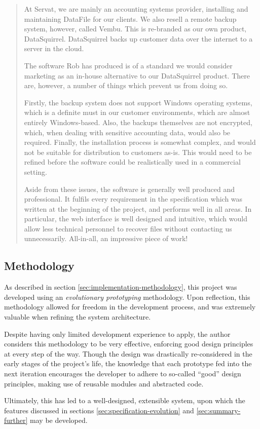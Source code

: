 \begin{quote}
\begin{em}

    At Servat, we are mainly an accounting systems provider, installing and
    maintaining DataFile for our clients. We also resell a remote backup
    system, however, called Vembu. This is re-branded as our own product,
    DataSquirrel. DataSquirrel backs up customer data over the internet to
    a server in the cloud.

    The software Rob has produced is of a standard we would consider marketing
    as an in-house alternative to our DataSquirrel product. There are, however,
    a number of things which prevent us from doing so.
    
    Firstly, the backup system does not support Windows operating systems,
    which is a definite must in our customer environments, which are almost
    entirely Windows-based. Also, the backups themselves are not encrypted,
    which, when dealing with sensitive accounting data, would also be required.
    Finally, the installation process is somewhat complex, and would not be
    suitable for distribution to customers as-is. This would need to be refined
    before the software could be realistically used in a commercial setting.

    Aside from these issues, the software is generally well produced and
    professional. It fulfils every requirement in the specification which was
    written at the beginning of the project, and performs well in all areas. In
    particular, the web interface is well designed and intuitive, which would
    allow less technical personnel to recover files without contacting us
    unnecessarily. All-in-all, an impressive piece of work!

\end{em}
\end{quote}

\subsection{Methodology}

As described in section \ref{sec:implementation-methodology}, this project was
developed using an \emph{evolutionary prototyping} methodology. Upon
reflection, this methodology allowed for freedom in the development process,
and was extremely valuable when refining the system architecture.

Despite having only limited development experience to apply, the author
considers this methodology to be very effective, enforcing good design
principles at every step of the way. Though the design was drastically
re-considered in the early stages of the project's life, the knowledge that
each prototype fed into the next iteration encourages the developer to adhere
to so-called ``good'' design principles, making use of reusable modules and
abstracted code.

Ultimately, this has led to a well-designed, extensible system, upon which the
features discussed in sections \ref{sec:specification-evolution} and
\ref{sec:summary-further} may be developed.
